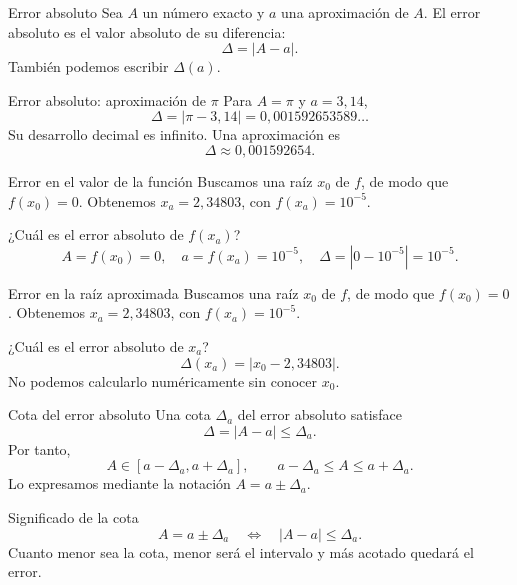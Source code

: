 \documentclass[original_version/main.tex]{subfiles}
\begin{document}
\graphicspath{{imagenes/tema6/}{../imagenes/tema6/}}



\begin{frame}{Error absoluto}
Sea $A$ un número exacto y $a$ una aproximación de $A$. El error absoluto es el valor absoluto de su diferencia:\[\boxed{\Delta=|A-a|.}\]También podemos escribir $\Delta(a)$.
\end{frame}

\begin{frame}{Error absoluto: aproximación de \texorpdfstring{$\pi$}{pi}}
Para $A=\pi$ y $a=3{,}14$,\[\Delta=|\pi-3{,}14|=0{,}001592653589\ldots\]Su desarrollo decimal es infinito. Una aproximación es\[\Delta\approx0{,}001592654.\]
\end{frame}

\begin{frame}{Error en el valor de la función}
Buscamos una raíz $x_0$ de $f$, de modo que $f(x_0)=0$. Obtenemos $x_a=2{,}34803$, con $f(x_a)=10^{-5}$.\par\medskip ¿Cuál es el error absoluto de $f(x_a)$?\[A=f(x_0)=0,\quad a=f(x_a)=10^{-5},\quad\Delta=|0-10^{-5}|=10^{-5}.\]
\end{frame}

\begin{frame}{Error en la raíz aproximada}
Buscamos una raíz $x_0$ de $f$, de modo que $f(x_0)=0$. Obtenemos $x_a=2{,}34803$, con $f(x_a)=10^{-5}$.\par\medskip ¿Cuál es el error absoluto de $x_a$?\[\Delta(x_a)=|x_0-2{,}34803|.\]No podemos calcularlo numéricamente sin conocer $x_0$.
\end{frame}

\begin{frame}{Cota del error absoluto}
Una cota $\Delta_a$ del error absoluto satisface\[\Delta=|A-a|\le\Delta_a.\]Por tanto,\[A\in[a-\Delta_a,a+\Delta_a],\qquad a-\Delta_a\le A\le a+\Delta_a.\]Lo expresamos mediante la notación $A=a\pm\Delta_a$.
\end{frame}

\begin{frame}{Significado de la cota}
\[A=a\pm\Delta_a\quad\Longleftrightarrow\quad |A-a|\le\Delta_a.\]Cuanto menor sea la cota, menor será el intervalo y más acotado quedará el error.
\end{frame}
\end{document}
